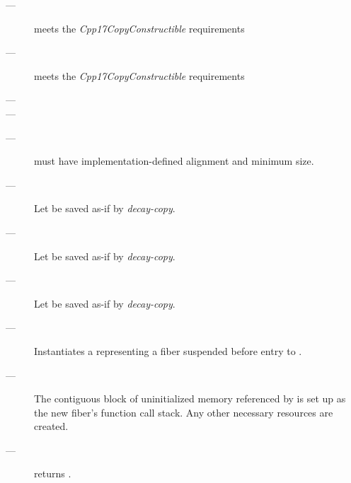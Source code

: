 
\mandates
\begin{description}
    \item[---]  meets the \emph{Cpp17CopyConstructible} requirements
    \item[---]  meets the \emph{Cpp17CopyConstructible} requirements
    \item[---] 
    \item[---] 
\end{description}

\precond
\begin{description}
    \item[---]  must have implementation-defined alignment and minimum size.
\end{description}

\effects
\begin{description}
    \item[---] Let  be saved as-if by \emph{decay-copy}.
    \item[---] Let  be saved as-if by \emph{decay-copy}.
    \item[---] Let  be saved as-if by \emph{decay-copy}.
    \item[---] Instantiates a \fiber representing a fiber suspended before
              entry to .
    \item[---] The contiguous block of uninitialized memory referenced
              by  is set up as the new fiber's function call stack.
              Any other necessary resources are created.
\end{description}

\postcond
\begin{description}
    \item[---] \emptyfn returns \false.
\end{description}

